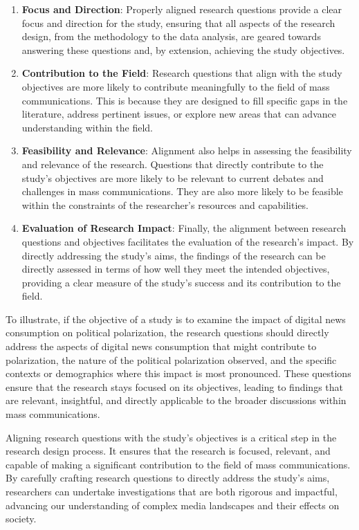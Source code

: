 \documentclass[
]{book}
\begin{document}
\begin{enumerate}
\def\labelenumi{\arabic{enumi}.}
\item
  \textbf{Focus and Direction}: Properly aligned research questions provide a clear focus and direction for the study, ensuring that all aspects of the research design, from the methodology to the data analysis, are geared towards answering these questions and, by extension, achieving the study objectives.
\item
  \textbf{Contribution to the Field}: Research questions that align with the study objectives are more likely to contribute meaningfully to the field of mass communications. This is because they are designed to fill specific gaps in the literature, address pertinent issues, or explore new areas that can advance understanding within the field.
\item
  \textbf{Feasibility and Relevance}: Alignment also helps in assessing the feasibility and relevance of the research. Questions that directly contribute to the study's objectives are more likely to be relevant to current debates and challenges in mass communications. They are also more likely to be feasible within the constraints of the researcher's resources and capabilities.
\item
  \textbf{Evaluation of Research Impact}: Finally, the alignment between research questions and objectives facilitates the evaluation of the research's impact. By directly addressing the study's aims, the findings of the research can be directly assessed in terms of how well they meet the intended objectives, providing a clear measure of the study's success and its contribution to the field.
\end{enumerate}

To illustrate, if the objective of a study is to examine the impact of digital news consumption on political polarization, the research questions should directly address the aspects of digital news consumption that might contribute to polarization, the nature of the political polarization observed, and the specific contexts or demographics where this impact is most pronounced. These questions ensure that the research stays focused on its objectives, leading to findings that are relevant, insightful, and directly applicable to the broader discussions within mass communications.

Aligning research questions with the study's objectives is a critical step in the research design process. It ensures that the research is focused, relevant, and capable of making a significant contribution to the field of mass communications. By carefully crafting research questions to directly address the study's aims, researchers can undertake investigations that are both rigorous and impactful, advancing our understanding of complex media landscapes and their effects on society.
\end{document}
